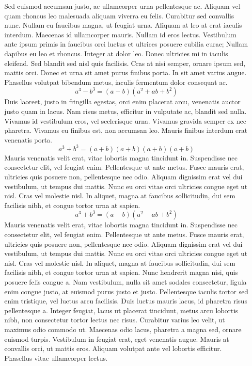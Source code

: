 \documentclass{article}
\begin{document}
Sed euismod accumsan justo, ac ullamcorper urna pellentesque ac. Aliquam vel quam rhoncus leo malesuada aliquam viverra eu felis. Curabitur sed convallis nunc. Nullam eu faucibus magna, ut feugiat urna. Aliquam at leo at erat iaculis interdum. Maecenas id ullamcorper mauris. Nullam id eros lectus. Vestibulum ante ipsum primis in faucibus orci luctus et ultrices posuere cubilia curae; Nullam dapibus eu leo et rhoncus. Integer at dolor leo. Donec ultricies mi in iaculis eleifend. Sed blandit sed nisl quis facilisis. Cras at nisi semper, ornare ipsum sed, mattis orci. Donec et urna sit amet purus finibus porta. In sit amet varius augue. Phasellus volutpat bibendum metus, iaculis fermentum dolor consequat ac.
$$ a^{3} - b^{3} = (a-b)(a^{2}+ab+b^{2}) $$
Duis laoreet, justo in fringilla egestas, orci enim placerat arcu, venenatis auctor justo quam in lacus. Nam risus metus, efficitur in vulputate ac, blandit sed nulla. Vivamus id vestibulum eros, vel scelerisque urna. Vivamus gravida semper ex nec pharetra. Vivamus eu finibus est, non accumsan leo. Mauris finibus interdum erat venenatis porta. 
\begin{displaymath}
a^{3} + b^{3} = (a+b)(a+b)(a+b)(a+b)
\end{displaymath}
Mauris venenatis velit erat, vitae lobortis magna tincidunt in. Suspendisse nec consectetur elit, vel feugiat enim. Pellentesque ut ante metus. Fusce mauris erat, ultricies quis posuere non, pellentesque nec odio. Aliquam dignissim erat vel dui vestibulum, ut tempus dui mattis. Nunc eu orci vitae orci ultricies congue eget ut nisl. Cras vel molestie nisl. In aliquet, magna at faucibus sollicitudin, dui sem facilisis nibh, et congue tortor urna at sapien.
\[ a^{3} + b^{3} = (a+b)(a^{2}-ab+b^{2}) \]
Mauris venenatis velit erat, vitae lobortis magna tincidunt in. Suspendisse nec consectetur elit, vel feugiat enim. Pellentesque ut ante metus. Fusce mauris erat, ultricies quis posuere non, pellentesque nec odio. Aliquam dignissim erat vel dui vestibulum, ut tempus dui mattis. Nunc eu orci vitae orci ultricies congue eget ut nisl. Cras vel molestie nisl. In aliquet, magna at faucibus sollicitudin, dui sem facilisis nibh, et congue tortor urna at sapien.
Nunc hendrerit magna nisi, quis posuere felis congue a. Nam vestibulum, nulla sit amet sodales consectetur, ligula enim congue justo, at euismod purus justo et justo. Pellentesque iaculis tortor sed enim tristique, vel luctus arcu facilisis. Duis luctus mauris lacus, id pharetra risus pellentesque a. Integer feugiat, lacus ut placerat tincidunt, metus arcu lobortis nibh, non consectetur tortor lectus nec risus. Curabitur varius leo velit, ut maximus odio commodo ut. Maecenas odio lacus, pharetra a magna sed, ornare euismod turpis. Vestibulum in feugiat erat, eget venenatis augue. Mauris at convallis orci, ut mattis eros. Aliquam volutpat ante vel lobortis efficitur. Phasellus vitae ullamcorper lectus.
\end{document}
